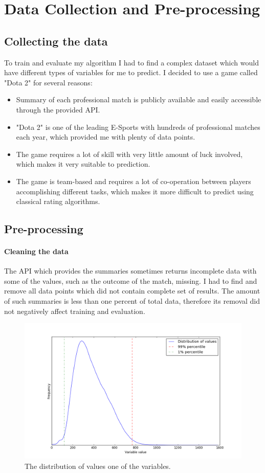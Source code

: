 \documentclass[12pt,a4paper]{book}
\begin{document}
\section{Data Collection and Pre-processing}
\subsection{Collecting the data}
To train and evaluate my algorithm I had to find a complex dataset which would have different types of variables for me to predict.
I decided to use a game called "Dota 2" for several reasons:
\begin{itemize}
\item Summary of each professional match is publicly available and easily accessible through the provided API.
\item "Dota 2" is one of the leading E-Sports with hundreds of professional matches each year, which provided me with plenty of data points.
\item The game requires a lot of skill with very little amount of luck involved, which makes it very suitable to prediction.
\item The game is team-based and requires a lot of co-operation between players accomplishing different tasks, which makes it more difficult to predict using classical rating algorithms.
\end{itemize}
\begin{figure}

\end{figure}
\subsection{Pre-processing}
\paragraph{Cleaning the data}
The API which provides the summaries sometimes returns incomplete data with some of the values, such as the outcome of the match, missing.
I had to find and remove all data points which did not contain complete set of results.
The amount of such summaries is less than one percent of total data, therefore its removal did not negatively affect training and evaluation.
\begin{figure}[ht]
\centering
\includegraphics[scale=0.5]{outliers}
\caption{The distribution of values one of the variables.}
\label{fig:outliers}
\end{figure}
\end{document}
